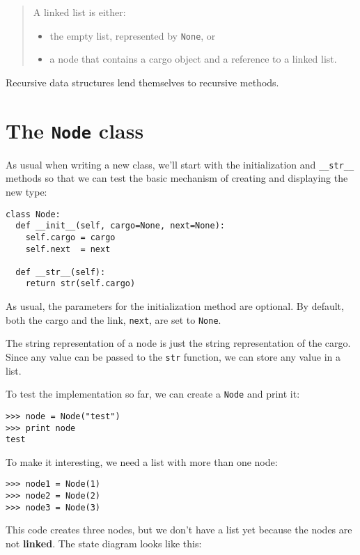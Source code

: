 \begin{quote}
A linked list is either:
\begin{itemize}

\item the empty list, represented by {\tt None}, or

\item a node that contains a cargo object and a reference
to a linked list.

\end{itemize}

\end{quote}


Recursive data structures lend themselves to
recursive methods.


\section{The {\tt Node} class}

As usual when writing a new class, we'll start with the
initialization and {\tt \_\_str\_\_} methods so that we
can test the basic mechanism of creating and displaying the new
type:

\beforeverb
\begin{verbatim}
class Node:
  def __init__(self, cargo=None, next=None):
    self.cargo = cargo
    self.next  = next

  def __str__(self):
    return str(self.cargo)
\end{verbatim}
\afterverb
%
As usual, the parameters for the initialization method are optional. By
default, both the cargo and the link, {\tt next}, are set
to {\tt None}.

The string representation of a node is just the string representation
of the cargo.  Since any value can be passed to the {\tt str}
function, we can store any value in a list.

To test the implementation so far, we can create a {\tt Node}
and print it:

\beforeverb
\begin{verbatim}
>>> node = Node("test")
>>> print node
test
\end{verbatim}
\afterverb
%
To make it interesting, we need a list with more than
one node:

\beforeverb
\begin{verbatim}
>>> node1 = Node(1)
>>> node2 = Node(2)
>>> node3 = Node(3)
\end{verbatim}
\afterverb
%
This code creates three nodes, but we don't have a list yet
because the nodes are not {\bf linked}.  The state diagram
looks like this:

